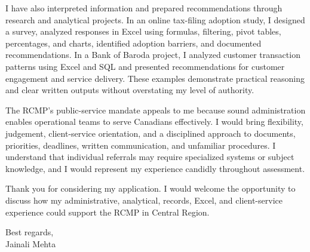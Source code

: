 \documentclass[letterpaper,11pt]{article}
\begin{document}
\bigbreak
I have also interpreted information and prepared recommendations through research and analytical projects. In an online tax-filing adoption study, I designed a survey, analyzed responses in Excel using formulas, filtering, pivot tables, percentages, and charts, identified adoption barriers, and documented recommendations. In a Bank of Baroda project, I analyzed customer transaction patterns using Excel and SQL and presented recommendations for customer engagement and service delivery. These examples demonstrate practical reasoning and clear written outputs without overstating my level of authority.

\bigbreak
The RCMP's public-service mandate appeals to me because sound administration enables operational teams to serve Canadians effectively. I would bring flexibility, judgement, client-service orientation, and a disciplined approach to documents, priorities, deadlines, written communication, and unfamiliar procedures. I understand that individual referrals may require specialized systems or subject knowledge, and I would represent my experience candidly throughout assessment.

\bigbreak
Thank you for considering my application. I would welcome the opportunity to discuss how my administrative, analytical, records, Excel, and client-service experience could support the RCMP in Central Region.

\bigbreak
Best regards,\\
Jainali Mehta
\end{document}
